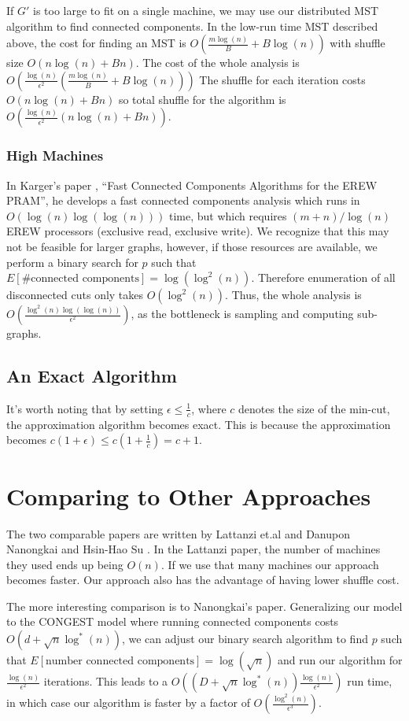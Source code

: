\documentclass{article}
\begin{document}
If $G'$ is too large to fit on a single machine, we may use our distributed MST algorithm to find connected components. In the low-run time MST described above, the cost for finding an MST is $O(\frac{m \log(n)}{B} + B\log(n))$ with shuffle size $O(n\log(n) + Bn)$. The cost of the whole analysis is $O(\frac{\log(n)}{\epsilon^2} (\frac{m \log(n)}{B} + B \log(n)))$ The shuffle for each iteration costs $O(n\log(n) + Bn)$ so total shuffle for the algorithm is $O(\frac{\log(n)}{\epsilon^2}(n\log(n) + Bn))$.

\subsubsection{High Machines}
In Karger's paper \cite{Fast-CC}, ``Fast Connected Components Algorithms for the EREW PRAM'', he develops a fast connected components analysis which runs in $O(\log(n) \log(\log(n)))$ time, but which requires $(m + n)/\log(n)$ EREW processors (exclusive read, exclusive write). We recognize that this may not be feasible for larger graphs, however, if those resources are available, we perform a binary search for $p$ such that $E[\text{\# connected components}] = \log(\log^2(n))$. Therefore enumeration of all disconnected cuts only takes $O(\log^2(n))$. Thus, the whole analysis is $O(\frac{\log^2(n) \log(\log(n))}{\epsilon^2})$, as the bottleneck is sampling and computing sub-graphs.

\subsection{An Exact Algorithm}
It's worth noting that by setting $\epsilon \leq \frac{1}{c}$, where $c$ denotes the size of the min-cut, the approximation algorithm becomes exact. This is because the approximation becomes  $ c (1 + \epsilon) \leq c (1 + \frac{1}{c}) = c + 1$.


\section{Comparing to Other Approaches} 

The two comparable papers are written by Lattanzi et.al \cite{Map-Reduce-Karger} and Danupon Nanongkai  and Hsin-Hao Su \cite{Almost-Tight}. In the Lattanzi paper, the number of machines they used ends up being $O(n)$. If we use that many machines our approach becomes faster. Our approach also has the advantage of having lower shuffle cost. 

The more interesting comparison is to Nanongkai's paper. Generalizing our model to the CONGEST model where running connected components costs $O(d + \sqrt{n} \log^*(n))$, we can adjust our binary search algorithm to find $p$ such that $E[\text{number connected components}] = \log(\sqrt{n})$ and run our algorithm for $\frac{\log(n)}{\epsilon^2}$ iterations. This leads to a $O((D + \sqrt{n} \log^*(n)) \frac{\log(n)}{\epsilon^2})$ run time, in which case our algorithm is faster by a factor of $O(\frac{\log^2(n)}{\epsilon^3})$.
\end{document}
